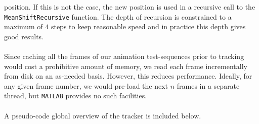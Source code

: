 \documentclass[a4paper,11pt]{article}
\begin{document}
		position. If this is not the case, the new position is used in a recursive call to
		the \verb|MeanShiftRecursive| function. The depth of recursion is constrained to a
		maximum of $4$ steps to keep reasonable speed and in practice this depth gives good
		results.
		\\ \\
		Since caching all the frames of our animation test-sequences prior to
		tracking would cost a prohibitive amount of memory, we read each frame
		incrementally from disk on an as-needed basis. However, this reduces
		performance. Ideally, for any given frame number, we would pre-load the
		next $n$ frames in a separate thread, but \verb|MATLAB| provides no such
		facilities.
		\\ \\
		A pseudo-code global overview of the tracker is included below.
\end{document}
